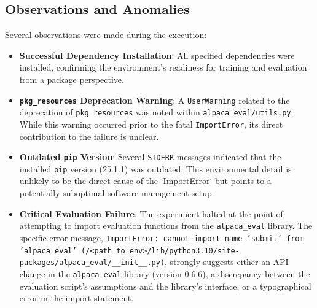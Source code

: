\documentclass[11pt]{article}
\begin{document}
\subsection{Observations and Anomalies}
Several observations were made during the execution:
\begin{itemize}
    \item \textbf{Successful Dependency Installation}: All specified dependencies were installed, confirming the environment's readiness for training and evaluation from a package perspective.
    \item \textbf{\texttt{pkg\_resources} Deprecation Warning}: A \texttt{UserWarning} related to the deprecation of \texttt{pkg\_resources} was noted within \texttt{alpaca\_eval/utils.py}. While this warning occurred prior to the fatal \texttt{ImportError}, its direct contribution to the failure is unclear.
    \item \textbf{Outdated \texttt{pip} Version}: Several \texttt{STDERR} messages indicated that the installed \texttt{pip} version (25.1.1) was outdated. This environmental detail is unlikely to be the direct cause of the `ImportError` but points to a potentially suboptimal software management setup.
    \item \textbf{Critical Evaluation Failure}: The experiment halted at the point of attempting to import evaluation functions from the \texttt{alpaca\_eval} library. The specific error message, \texttt{ImportError: cannot import name 'submit' from 'alpaca\_eval' (/<path\_to\_env>/lib/python3.10/site-packages/alpaca\_eval/\_\_init\_\_.py)}, strongly suggests either an API change in the \texttt{alpaca\_eval} library (version 0.6.6), a discrepancy between the evaluation script's assumptions and the library's interface, or a typographical error in the import statement.
\end{itemize}
\end{document}
